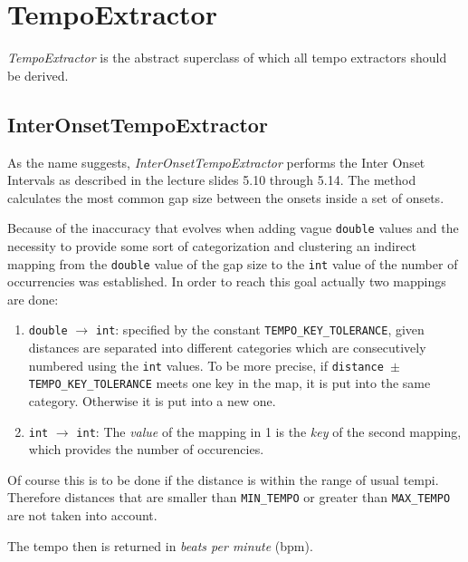 \section{\ttfamily TempoExtractor} \label{sec:tempo}
\emph{TempoExtractor} is the abstract superclass of which all tempo extractors
should be derived.

\subsection{\ttfamily InterOnsetTempoExtractor} \label{ssec:tempointeronset}
As the name suggests, \emph{InterOnsetTempoExtractor} performs the Inter Onset
Intervals as described in the lecture slides 5.10 through 5.14. The method
calculates the most common gap size between the onsets inside a set of onsets. 

Because of the inaccuracy that evolves when adding vague \texttt{double}
values and the necessity to provide some sort of categorization and
clustering an indirect mapping from the \texttt{double} value of the
gap size to the \texttt{int} value of the number of occurrencies was
established. In order to reach this goal actually two mappings are done:

\begin{enumerate}
  \item \texttt{double} $\rightarrow$ \texttt{int}: specified by the constant
  \texttt{TEMPO\_KEY\_TOLERANCE}, given distances are separated into different
  categories which are consecutively numbered using the \texttt{int} values. To
  be more precise, if \texttt{distance $\pm$ TEMPO\_KEY\_TOLERANCE}
  meets one key in the map, it is put into the same category. Otherwise it is
  put into a new one.
  \item \texttt{int} $\rightarrow$ \texttt{int}: The \emph{value} of the
  mapping in 1 is the \emph{key} of the second mapping, which provides the
  number of occurencies.
\end{enumerate}

Of course this is to be done if the distance is within the range of usual tempi.
Therefore distances that are smaller than \texttt{MIN\_TEMPO} or greater than
\texttt{MAX\_TEMPO} are not taken into account.

The tempo then is returned in \emph{beats per minute} (bpm).

